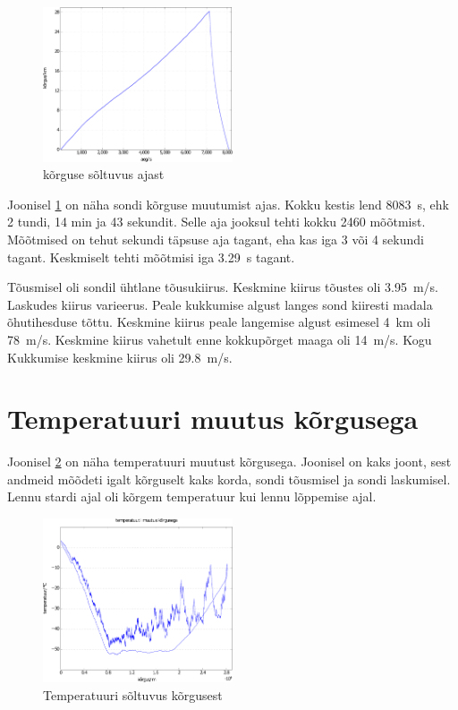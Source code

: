 \documentclass{trkut}%
\begin{document}
\begin{figure}[h]
	\includegraphics[width=0.5\textwidth]{PicGra/kõraeg.pdf}
	\caption{kõrguse sõltuvus ajast}
	\label{kõraeg}
\end{figure}

Joonisel \ref{kõraeg} on näha sondi kõrguse muutumist ajas. Kokku kestis lend \SI{8083}{s}, ehk 2 tundi, 14 min ja 43 sekundit. Selle aja jooksul tehti kokku 2460 mõõtmist. Mõõtmised on tehut sekundi täpsuse aja tagant, eha kas iga 3 või 4 sekundi tagant. Keskmiselt tehti mõõtmisi iga \SI{3.29}{s} tagant.

Tõusmisel oli sondil ühtlane tõusukiirus. Keskmine kiirus tõustes oli \SI{3.95}{m/s}. Laskudes kiirus varieerus. Peale kukkumise algust langes sond kiiresti madala õhutihesduse tõttu. Keskmine kiirus peale langemise algust esimesel \SI{4}{km} oli \SI{78}{m/s}. Keskmine kiirus vahetult enne kokkupõrget maaga oli \SI{14}{m/s}. Kogu Kukkumise keskmine kiirus oli \SI{29.8}{m/s}.

\section{Temperatuuri muutus kõrgusega}
Joonisel \ref{TempKõrgus} on näha temperatuuri muutust kõrgusega. Joonisel on kaks joont, sest andmeid mõõdeti igalt kõrguselt kaks korda, sondi tõusmisel ja sondi laskumisel. Lennu stardi ajal oli kõrgem temperatuur kui lennu lõppemise ajal.

\begin{figure}[h]
	\includegraphics[width=0.5\textwidth]{PicGra/tempkõr.pdf}
	\caption{Temperatuuri sõltuvus kõrgusest}
	\label{TempKõrgus}%
\end{figure}
\end{document}
